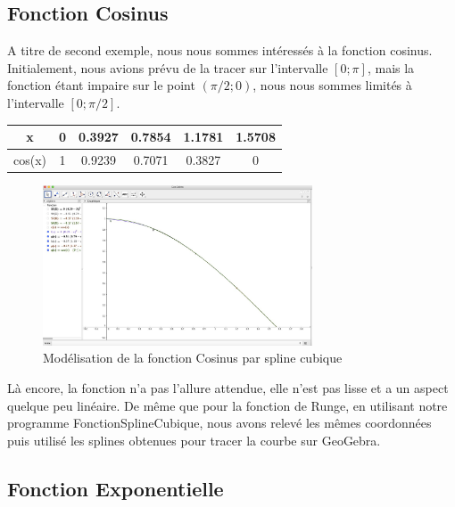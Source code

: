 \documentclass{article}
\begin{document}
\newpage
\subsection{Fonction Cosinus} 

A titre de second exemple, nous nous sommes int\'{e}ress\'{e}s \`a la fonction
cosinus. Initialement, nous avions pr\'{e}vu de la tracer sur l'intervalle $[0; \pi]$, mais la fonction \'{e}tant impaire sur le point $(\pi/2 ; 0)$, nous nous sommes limit\'{e}s \`a l'intervalle $[0; \pi/2]$.\\

\begin{center}
\begin{table}[!hbp]
\begin{center}
\begin{tabular}{|c|c|c|c|c|c|}
\hline
\hline
 x & 0 & 0.3927 & 0.7854 & 1.1781 & 1.5708 \\
\hline
 cos(x) & 1 & 0.9239 & 0.7071 & 0.3827 & 0 \\
\hline
\end{tabular}
\end{center}
\end{table} 
\end{center}

\begin{figure}[h]
	\centering
	\includegraphics[width=8cm]{FonctionCosinus.jpg}
	\caption{Mod\'{e}lisation de la fonction Cosinus par spline cubique}
\end{figure}

L\`a encore, la fonction n'a pas l'allure attendue, elle n'est pas lisse et a un aspect quelque peu lin\'{e}aire.
De m\^{e}me que pour la fonction de Runge, en utilisant notre programme FonctionSplineCubique, nous avons relev\'{e} les m\^{e}mes coordonn\'{e}es puis utilis\'{e} les splines obtenues pour tracer la courbe sur GeoGebra.\\

\newpage

\subsection{Fonction Exponentielle} 
\end{document}
